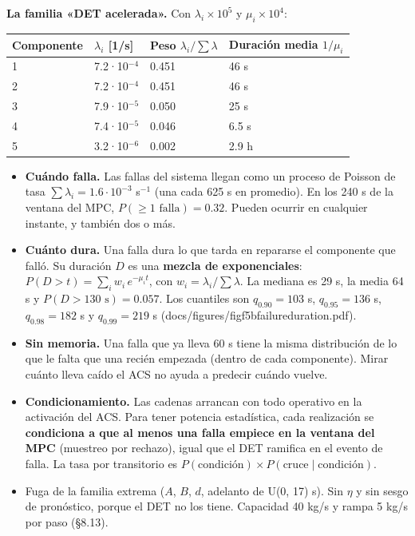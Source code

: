 \documentclass[11pt,a4paper]{article}
\newcommand{\codeus}{\textunderscore\allowbreak}
\newcommand{\code}[1]{{\small\ttfamily\let\_\codeus #1}}
\begin{document}
\textbf{La familia «DET acelerada».} Con $\lambda_i\times10^5$ y $\mu_i\times10^4$:

{\footnotesize
\begin{xltabular}{\linewidth}{@{}YYYY@{}}
\toprule
\textbf{Componente} & \textbf{$\lambda_i$ [1/s]} & \textbf{Peso $\lambda_i/\sum\lambda$} & \textbf{Duración media $1/\mu_i$} \\
\midrule
{} & 7.2·10$^{-4}$ & 0.451 & 46 s \\
2 & 7.2·10$^{-4}$ & 0.451 & 46 s \\
3 & 7.9·10$^{-5}$ & 0.050 & 25 s \\
4 & 7.4·10$^{-5}$ & 0.046 & 6.5 s \\
5 & 3.2·10$^{-6}$ & 0.002 & 2.9 h \\
\bottomrule
\end{xltabular}}

\begin{itemize}
\item \textbf{Cuándo falla.} Las fallas del sistema llegan como un proceso de Poisson de tasa $\sum\lambda_i=1.6\cdot10^{-3}$ s$^{-1}$ (una cada 625 s en promedio). En los 240 s de la ventana del MPC, $P(\ge1\text{ falla})=0.32$. Pueden ocurrir en cualquier instante, y también dos o más.
\item \textbf{Cuánto dura.} Una falla dura lo que tarda en repararse el componente que falló. Su duración $D$ es una \textbf{mezcla de exponenciales}: $P(D>t)=\sum_i w_i\,e^{-\mu_i t}$, con $w_i=\lambda_i/\sum\lambda$. La mediana es 29 s, la media 64 s y $P(D>130\text{ s})=0.057$. Los cuantiles son $q_{0.90}=103$ s, $q_{0.95}=136$ s, $q_{0.98}=182$ s y $q_{0.99}=219$ s (\code{docs/figures/fig\_f5b\_failure\_duration.pdf}).
\item \textbf{Sin memoria.} Una falla que ya lleva 60 s tiene la misma distribución de lo que le falta que una recién empezada (dentro de cada componente). Mirar cuánto lleva caído el ACS no ayuda a predecir cuándo vuelve.
\item \textbf{Condicionamiento.} Las cadenas arrancan con todo operativo en la activación del ACS. Para tener potencia estadística, cada realización se \textbf{condiciona a que al menos una falla empiece en la ventana del MPC} (muestreo por rechazo), igual que el DET ramifica en el evento de falla. La tasa por transitorio es $P(\text{condición})\times P(\text{cruce}\mid\text{condición})$.
\item Fuga de la familia extrema ($A$, $B$, $d$, adelanto de U(0, 17) s). Sin $\eta$ y sin sesgo de pronóstico, porque el DET no los tiene. Capacidad 40 kg/s y rampa 5 kg/s por paso (\S{}8.13).
\end{itemize}
\end{document}

